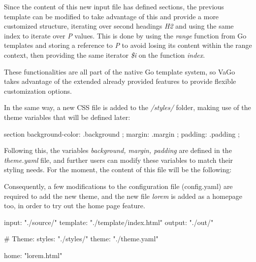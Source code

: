 Since the content of this new input file has defined sections, the previous template can be modified to take advantage
of this and provide a more customized structure, iterating over second headings \emph{H2} and using the same index to
iterate over \emph{P} values.
This is done by using the \emph{range} function from Go templates and storing a
reference to \emph{P} to avoid losing its content within the range context, then providing the same iterator
\emph{\$i} on the function \emph{index}.

These functionalities are all part of the native Go template system, so VaGo takes advantage of the extended already
provided features to provide flexible customization options.


In the same way, a new CSS file is added to the \emph{/styles/} folder, making use of the theme variables that will be
defined later:

\begin{code}
section{
background-color: {{ .background }};
margin: {{ .margin }};
padding:  {{ .padding }};
}
\end{code}

Following this, the variables \emph{background, margin, padding} are defined in the \emph{theme.yaml} file, and
further users can modify these variables to match their styling needs. For the moment, the content of this file will
be the following:


Consequently, a few modifications to the configuration file (config.yaml) are required to add the new theme, and the
new file \emph{lorem} is added as a homepage too, in order to try out the home page feature.

\begin{code}
input: "./source/"
template: "./template/index.html"
output: "./out/"

# Theme:
styles: "./styles/"
theme: "./theme.yaml"

home: "lorem.html"
\end{code}

